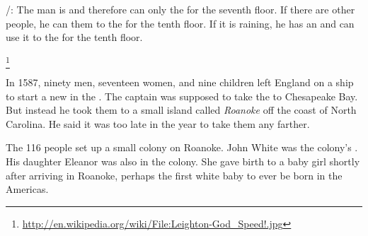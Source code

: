 /:
The man is  and therefore can only  the  for the seventh floor.
If there are other people, he can  them to  the  for the tenth floor.
If it is {raining}, he has an  and can use it to  the  for the tenth floor.


\bannerWhatsUp
\footnote{\url{http://en.wikipedia.org/wiki/File:Leighton-God_Speed!.jpg}}

\newpage
\bannerMysHis
%

In 1587, ninety men, seventeen women, and nine children left England on a ship
to start a new  in the .
The captain was supposed to take the  to Chesapeake Bay.
But instead he took them to a small island called \emph{Roanoke} off the coast of North Carolina.
He said it was too late in the year to take them any farther.

The 116 people set up a small colony on Roanoke.
John White was the colony's .
His daughter Eleanor was also in the colony.
She gave birth to a baby girl shortly after arriving in Roanoke,
perhaps the first white baby to ever be born in the Americas.

